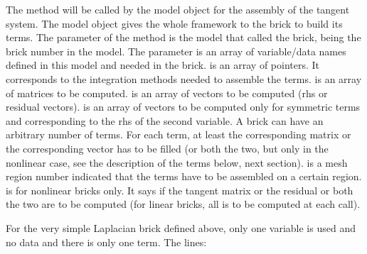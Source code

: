 \documentclass[a4paper,11pt,english]{sphinxmanual}
\begin{document}
The method  will be called by the model object for the
assembly of the tangent system. The model object gives the whole framework to the
brick to build its terms. The parameter  of the 
method is the model that called the brick,  being the brick number in the
model. The parameter  is an array of variable/data names defined in this
model and needed in the brick.  is an array of  pointers. It
corresponds to the integration methods needed to assemble the terms.  is
an array of matrices to be computed.  is an array of vectors to be
computed (rhs or residual vectors).   is an array of vectors to be
computed only for symmetric terms and corresponding to the rhs of the second
variable. A brick can have an arbitrary number of terms. For each term, at least
the corresponding matrix or the corresponding vector has to be filled (or both the
two, but only in the nonlinear case, see the description of the terms below, next
section).  is a mesh region number indicated that the terms have to be
assembled on a certain region.  is for nonlinear bricks only. It says if the
tangent matrix or the residual or both the two are to be computed (for linear
bricks, all is to be computed at each call).

For the very simple Laplacian brick defined above, only one variable is used and
no data and there is only one term. The lines:

\begin{sphinxVerbatim}[commandchars=\\\{\}]
  
  
      
\end{sphinxVerbatim}
\end{document}
